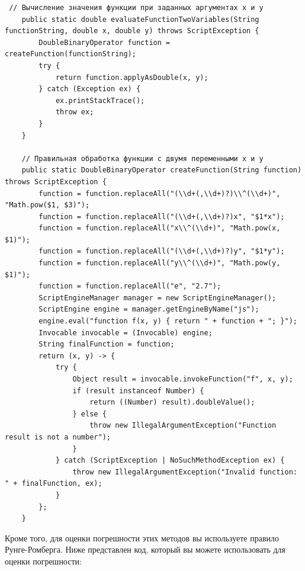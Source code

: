 \documentclass[12pt]{article}
\begin{document}
    \begin{verbatim}
 // Вычисление значения функции при заданных аргументах x и y
    public static double evaluateFunctionTwoVariables(String functionString, double x, double y) throws ScriptException {
        DoubleBinaryOperator function = createFunction(functionString);
        try {
            return function.applyAsDouble(x, y);
        } catch (Exception ex) {
            ex.printStackTrace();
            throw ex;
        }
    }

    // Правильная обработка функции с двумя переменными x и y
    public static DoubleBinaryOperator createFunction(String function) throws ScriptException {
        function = function.replaceAll("(\\d+(,\\d+)?)\\^(\\d+)", "Math.pow($1, $3)");
        function = function.replaceAll("(\\d+(,\\d+)?)x", "$1*x");
        function = function.replaceAll("x\\^(\\d+)", "Math.pow(x, $1)");
        function = function.replaceAll("(\\d+(,\\d+)?)y", "$1*y");
        function = function.replaceAll("y\\^(\\d+)", "Math.pow(y, $1)");
        function = function.replaceAll("e", "2.7");
        ScriptEngineManager manager = new ScriptEngineManager();
        ScriptEngine engine = manager.getEngineByName("js");
        engine.eval("function f(x, y) { return " + function + "; }");
        Invocable invocable = (Invocable) engine;
        String finalFunction = function;
        return (x, y) -> {
            try {
                Object result = invocable.invokeFunction("f", x, y);
                if (result instanceof Number) {
                    return ((Number) result).doubleValue();
                } else {
                    throw new IllegalArgumentException("Function result is not a number");
                }
            } catch (ScriptException | NoSuchMethodException ex) {
                throw new IllegalArgumentException("Invalid function: " + finalFunction, ex);
            }
        };
    }
    \end{verbatim}

    Кроме того, для оценки погрешности этих методов вы используете правило Рунге-Ромберга. Ниже представлен код, который вы можете использовать для оценки погрешности:
\end{document}
